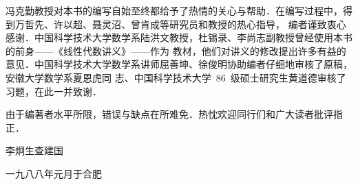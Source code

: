 \begin{fzliukai}
冯克勤教授对本书的编写自始至终都给予了热情的关心与帮助．在编写过程中，得到万哲先、许以超、聂灵沼、曾肯成等研究员和教授的热心指导，
编者谨致衷心感谢．中国科学技术大学数学系陆洪文教授，杜锡录、李尚志副教授曾经使用本书的前身{\fzwkai{}——《线性代数讲义》——}作为
教材，他们对讲义的修改提出许多有益的意见．中国科学技术大学数学系讲师屈善坤、徐俊明协助编者仔细地审核了原稿，安徽大学数学系夏恩虎同
志、中国科学技术大学~86~级硕士研究生黄道德审核了习题，在此一并致谢．

由于编著者水平所限，错误与缺点在所难免．热忱欢迎同行们和广大读者批评指正．

\begin{flushright}
\begin{minipage}[t][10mm][b]{5cm}\normalsize\normalfont\centering
{\fzqiti{}李炯生\hspace{.6\ccwd}查建国}\par
一九八八年元月于合肥
\end{minipage}
\end{flushright}
\end{fzliukai}




\PrintChEndLogo

